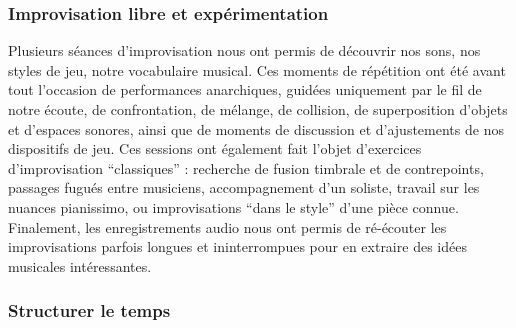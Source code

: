 \subsubsection{Improvisation libre et expérimentation}

\noindent Plusieurs séances d'improvisation nous ont permis de découvrir nos sons, nos styles de jeu, notre vocabulaire musical. Ces moments de répétition ont été avant tout l'occasion de performances anarchiques, guidées uniquement par le fil de notre écoute, de confrontation, de mélange, de collision, de superposition d'objets et d'espaces sonores, ainsi que de moments de discussion et d'ajustements de nos dispositifs de jeu. Ces sessions ont également fait l'objet d'exercices d'improvisation ``classiques'' : recherche de fusion timbrale et de contrepoints, passages fugués entre musiciens, accompagnement d'un soliste, travail sur les nuances pianissimo, ou improvisations ``dans le style'' d'une pièce connue. Finalement, les enregistrements audio nous ont permis de ré-écouter les improvisations parfois longues et ininterrompues pour en extraire des idées musicales intéressantes.\\

\subsubsection{Structurer le temps}

